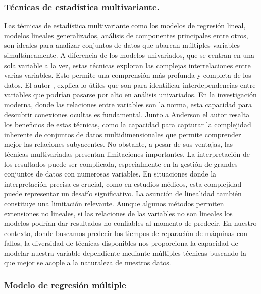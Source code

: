 \documentclass[
  11pt,
  bookmarksnumbered]{article}
\begin{document}
\hypertarget{tuxe9cnicas-de-estaduxedstica-multivariante.}{%
\subsubsection{Técnicas de estadística multivariante.}\label{tuxe9cnicas-de-estaduxedstica-multivariante.}}

Las técnicas de estadística multivariante como los modelos de regresión lineal, modelos lineales generalizados, análisis de componentes principales entre otros, son ideales para analizar conjuntos de datos que abarcan múltiples variables simultáneamente.
A diferencia de los modelos univariados, que se centran en una sola variable a la vez, estas técnicas exploran las complejas interrelaciones entre varias variables.
Esto permite una comprensión más profunda y completa de los datos.
El autor \textcite{anderson}, explica lo útiles que son para identificar interdependencias entre variables que podrían pasarse por alto en análisis univariados.
En la investigación moderna, donde las relaciones entre variables son la norma, esta capacidad para descubrir conexiones ocultas es fundamental.
Junto a Anderson el autor \textcite{hair} resalta los beneficios de estas técnicas, como la capacidad para capturar la complejidad inherente de conjuntos de datos multidimensionales que permite comprender mejor las relaciones subyacentes.
No obstante, a pesar de sus ventajas, las técnicas multivariadas presentan limitaciones importantes.
La interpretación de los resultados puede ser complicada, especialmente en la gestión de grandes conjuntos de datos con numerosas variables.
En situaciones donde la interpretación precisa es crucial, como en estudios médicos, esta complejidad puede representar un desafío significativo.
La asunción de linealidad también constituye una limitación relevante.
Aunque algunos métodos permiten extensiones no lineales, si las relaciones de las variables no son lineales los modelos podrían dar resultados no confiables al momento de predecir.
En nuestro contexto, donde buscamos predecir los tiempos de reparación de máquinas con fallos, la diversidad de técnicas disponibles nos proporciona la capacidad de modelar nuestra variable dependiente mediante múltiples técnicas buscando la que mejor se acople a la naturaleza de nuestros datos.

\hypertarget{modelo-de-regresiuxf3n-muxfaltiple}{%
\subsubsection{Modelo de regresión múltiple}\label{modelo-de-regresiuxf3n-muxfaltiple}}
\end{document}
